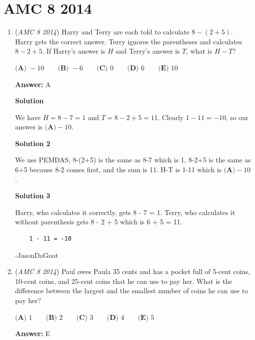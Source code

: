 \section{AMC 8 2014}
        \begin{enumerate}
        	\item (\textit{AMC 8 2014}) Harry and Terry are each told to calculate $8 - (2 + 5)$. Harry gets the correct answer. Terry ignores the parentheses and calculates $8 - 2 + 5$. If Harry's answer is $H$ and Terry's answer is $T$, what is $H - T$?


 $\textbf{(A) }-10\qquad\textbf{(B) }-6\qquad\textbf{(C) }0\qquad\textbf{(D) }6\qquad \textbf{(E) }10$

 \textbf{Answer: }A



\textbf{Solution}

We have $H=8-7=1$ and $T=8-2+5=11$. Clearly $1-11=-10$, so our answer is $\boxed{\textbf{(A)}-10}$.

 



\textbf{Solution 2}

We use PEMDAS, 8-(2+5) is the same as 8-7 which is 1, 8-2+5 is the same as 6+5 because 8-2 comes first, and the sum is 11. H-T is 1-11 which is $\boxed{\textbf{(A)}-10}$.

 



\textbf{Solution 3}

Harry, who calculates it correctly, gets 8 - 7 = 1. Terry, who calculates it without parenthesis gets 8 - 2 + 5 which is 6 + 5 = 11.

 \begin{verbatim}
	1 - 11 = -10
\end{verbatim}

-JasonDaGoat

 


 


	\item (\textit{AMC 8 2014}) Paul owes Paula 35 cents and has a pocket full of 5-cent coins, 10-cent coins, and 25-cent coins that he can use to pay her. What is the difference between the largest and the smallest number of coins he can use to pay her?


 $\textbf{(A) }1\qquad\textbf{(B) }2\qquad\textbf{(C) }3\qquad\textbf{(D) }4\qquad \textbf{(E) }5$

 \textbf{Answer: }E




\end{enumerate}
